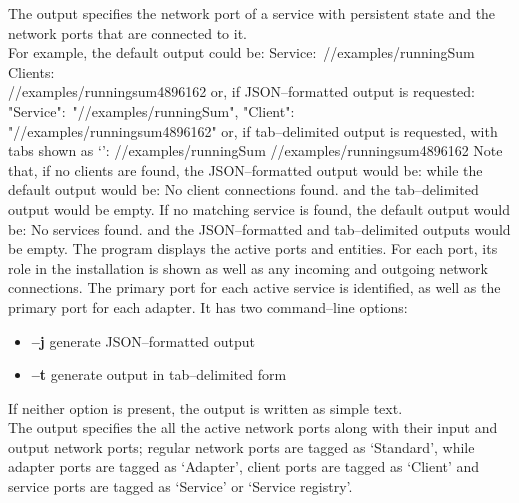 The output specifies the \yarp{} network port of a service with persistent state and the
\yarp{} network ports that are connected to it.\\

For example, the default output could be:
\outputBegin{}
Service:\ /\serviceName/examples/runningSum\\
\settowidth{\utilLen}{Service:\ }%
Clients:\\
\hspace*{\utilLen}/\clientName/examples/runningsum\textunderscore{}4896162
\outputEnd{}
or, if JSON--formatted output is requested:
\outputBegin{}
\openSq{} \textbraceleft{} "Service":\ "/\serviceName/examples/runningSum", "Client":\ \\
"/\clientName/examples/runningsum\textunderscore{}4896162" \textbraceright{} \closeSq
\outputEnd{}
or, if tab--delimited output is requested, with tabs shown as
`\texttt{\boldmath{$\vdash$}}':
\outputBegin{}
/\serviceName/examples/runningSum\pseudotab{}%
/\clientName/examples/runningsum\textunderscore{}4896162
\outputEnd{}
Note that, if no clients are found, the JSON--formatted output would be:
\outputBegin{}
\sqPair
\outputEnd{}
while the default output would be:
\outputBegin{}
No client connections found.
\outputEnd{}
and the tab--delimited output would be empty.
If no matching service is found, the default output would be:
\outputBegin{}
No services found.
\outputEnd{}
and the JSON--formatted and tab--delimited outputs would be empty.
The program  displays the active \yarp{} ports and \mplusm{}
entities.
For each \yarp{} port, its role in the \mplusm{} installation is shown as well as any
incoming and outgoing \yarp{} network connections.
The primary port for each active service is identified, as well as the primary port for
each adapter.
It has two command--line options:
\begin{itemize}
\item \textbf{--j} generate JSON--formatted output
\item \textbf{--t} generate output in tab--delimited form
\end{itemize}
If neither option is present, the output is written as simple text.\\

The output specifies the all the active \yarp{} network ports along with their input and
output \yarp{} network ports; regular \yarp{} network ports are tagged as `Standard',
while \mplusm{} adapter ports are tagged as `Adapter', \mplusm{} client ports are tagged
as `Client' and \mplusm{} service ports are tagged as `Service' or `Service registry'.\\

